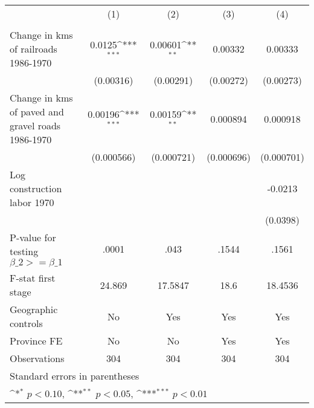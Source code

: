 {
\def\sym#1{\ifmmode^{#1}\else\(^{#1}\)\fi}
\begin{tabular}{l*{4}{c}}
\hline\hline
                &\multicolumn{1}{c}{(1)}&\multicolumn{1}{c}{(2)}&\multicolumn{1}{c}{(3)}&\multicolumn{1}{c}{(4)}\\
                &\multicolumn{1}{c}{}&\multicolumn{1}{c}{}&\multicolumn{1}{c}{}&\multicolumn{1}{c}{}\\
\hline
Change in kms of railroads 1986-1970&   0.0125\sym{***}&  0.00601\sym{**} &  0.00332         &  0.00333         \\
                &(0.00316)         &(0.00291)         &(0.00272)         &(0.00273)         \\
[1em]
Change in kms of paved and gravel roads 1986-1970&  0.00196\sym{***}&  0.00159\sym{**} & 0.000894         & 0.000918         \\
                &(0.000566)         &(0.000721)         &(0.000696)         &(0.000701)         \\
[1em]
Log construction labor 1970&                  &                  &                  &  -0.0213         \\
                &                  &                  &                  & (0.0398)         \\
\hline
P-value for testing $\beta\_{2} >= \beta\_{1}$&    .0001         &     .043         &    .1544         &    .1561         \\
F-stat first stage&   24.869         &  17.5847         &     18.6         &  18.4536         \\
Geographic controls&       No         &      Yes         &      Yes         &      Yes         \\
Province FE     &       No         &       No         &      Yes         &      Yes         \\
Observations    &      304         &      304         &      304         &      304         \\
\hline\hline
\multicolumn{5}{l}{\footnotesize Standard errors in parentheses}\\
\multicolumn{5}{l}{\footnotesize \sym{*} \(p<0.10\), \sym{**} \(p<0.05\), \sym{***} \(p<0.01\)}\\
\end{tabular}
}
